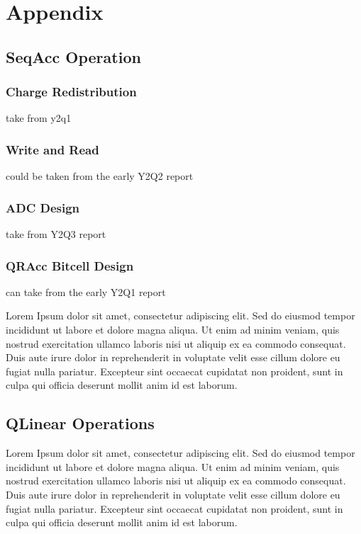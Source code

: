 \chapter*{Appendix}

\section{SeqAcc Operation}
\label{section:seqacc}

\subsection{Charge Redistribution}

take from y2q1 

\subsection{Write and Read}

could be taken from the early Y2Q2 report

\subsection{ADC Design}

take from Y2Q3 report

\subsection{QRAcc Bitcell Design}

can take from the early Y2Q1 report

Lorem Ipsum dolor sit amet, consectetur adipiscing elit. Sed do eiusmod tempor incididunt ut labore et dolore magna aliqua. Ut enim ad minim veniam, quis nostrud exercitation ullamco laboris nisi ut aliquip ex ea commodo consequat. Duis aute irure dolor in reprehenderit in voluptate velit esse cillum dolore eu fugiat nulla pariatur. Excepteur sint occaecat cupidatat non proident, sunt in culpa qui officia deserunt mollit anim id est laborum.

\section{QLinear Operations}
\label{section:qlinearops}
Lorem Ipsum dolor sit amet, consectetur adipiscing elit. Sed do eiusmod tempor incididunt ut labore et dolore magna aliqua. Ut enim ad minim veniam, quis nostrud exercitation ullamco laboris nisi ut aliquip ex ea commodo consequat. Duis aute irure dolor in reprehenderit in voluptate velit esse cillum dolore eu fugiat nulla pariatur. Excepteur sint occaecat cupidatat non proident, sunt in culpa qui officia deserunt mollit anim id est laborum.

